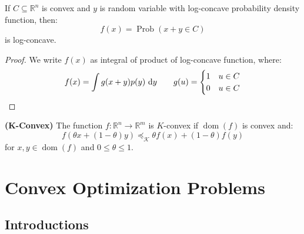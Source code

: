 \begin{proposition}
    If $C\subseteq \mathbb{R}^n$ is convex and $y$ is random variable with log-concave probability density function, then:
    \begin{equation*}
        f(x) = \operatorname{Prob}(x+y\in C)
    \end{equation*}
    is log-concave.
\end{proposition}
\begin{proof}
    We write $f(x)$ as integral of product of log-concave function, where:
    \begin{equation*}
        f(x) = \int g(x + y) p(y)\ \mathrm{d} y \qquad g(u) = \begin{cases}
            1 & u\in C \\
            0 & u\in C
        \end{cases}
    \end{equation*}
\end{proof}

\begin{definition}{\textbf{(K-Convex)}}
    The function $f:\mathbb{R}^n\rightarrow \mathbb{R}^m$ is $K$-convex if $\operatorname{dom}(f)$ is convex and:
    \begin{equation*}
        f(\theta x + (1-\theta)y)\preceq_\mathcal{K}\theta f(x) + (1-\theta)f(y)
    \end{equation*}
    for $x, y\in\operatorname{dom}(f)$ and $0\le\theta\le1$. 
\end{definition}

\section{Convex Optimization Problems}

\subsection{Introductions}


